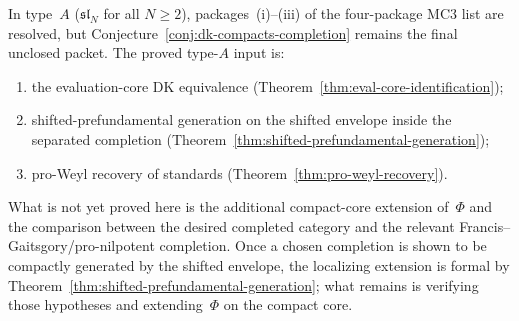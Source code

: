 \begin{remark}
\label{rem:dk-compacts-completion-typeA}
In type~$A$ ($\mathfrak{sl}_N$ for all $N \geq 2$),
packages~(i)--(iii) of the four-package MC3 list are resolved, but
Conjecture~\ref{conj:dk-compacts-completion} remains the final
unclosed packet. The proved type-$A$ input is:
\begin{enumerate}[label=\textup{(\roman*)},nosep]
\item the evaluation-core DK equivalence
 \textup{(}Theorem~\ref{thm:eval-core-identification}\textup{)};
\item shifted-prefundamental generation on the shifted envelope
 inside the separated completion
 \textup{(}Theorem~\ref{thm:shifted-prefundamental-generation}\textup{)};
\item pro-Weyl recovery of standards
 \textup{(}Theorem~\ref{thm:pro-weyl-recovery}\textup{)}.
\end{enumerate}
What is not yet proved here is the additional compact-core extension
of~$\Phi$ and the comparison between the desired completed category
and the relevant Francis--Gaitsgory/pro-nilpotent completion. Once a
chosen completion is shown to be compactly generated by the shifted
envelope, the localizing extension is formal by
Theorem~\ref{thm:shifted-prefundamental-generation}; what remains is
verifying those hypotheses and extending~$\Phi$ on the compact core.
\end{remark}

